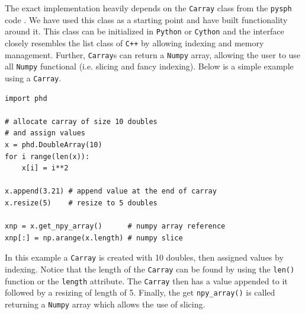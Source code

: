 The exact implementation heavily depends on the \lstinline{Carray} class from the \texttt{pysph} code 
\citep{Ramachandran2016}. We have used this class as a starting point and have built functionality around
it. This class can be initialized in \texttt{Python} or \texttt{Cython} and the
interface closely resembles the list class of \texttt{C++} by allowing indexing and memory management. 
Further, \lstinline{Carray}s can return a \texttt{Numpy} array, allowing the user to use all \texttt{Numpy} 
functional (i.e. slicing and fancy indexing). Below is a simple example using a \lstinline{Carray}.
\begin{lstlisting}
import phd

# allocate carray of size 10 doubles
# and assign values
x = phd.DoubleArray(10)
for i range(len(x)):
	x[i] = i**2

x.append(3.21) # append value at the end of carray
x.resize(5)    # resize to 5 doubles

xnp = x.get_npy_array()      # numpy array reference
xnp[:] = np.arange(x.length) # numpy slice
\end{lstlisting}
In this example a \lstinline{Carray} is created with 10 doubles, then assigned values by indexing. Notice
that the length of the \lstinline{Carray} can be found by using the \lstinline{len()} function or the 
\lstinline{length} attribute. The \lstinline{Carray} then has a value appended to it followed by
a resizing of length of 5. Finally, the get \lstinline{npy_array()} is called returning a \texttt{Numpy}
array which allows the use of slicing. 

